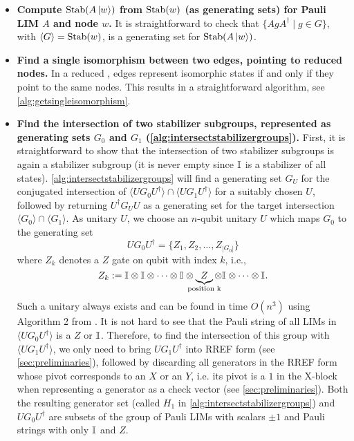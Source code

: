 \begin{itemize}
        \setlength\itemsep{1em}
    \item \textbf{Compute $\text{Stab}(A\ket{w})$ from $\text{Stab}(w)$ (as generating sets) for Pauli LIM $A$ and node $w$.} It is straightforward to check that $\{A g A^{\dagger} \mid g \in G\}$, with $\langle G \rangle = \text{Stab}(w)$, is a generating set for $\text{Stab}(A\ket{w})$.
    \item \textbf{Find a single isomorphism between two edges, pointing to reduced nodes.} In a reduced \limdd, edges represent isomorphic states if and only if they point to the same nodes. This results in a straightforward algorithm, see \autoref{alg:getsingleisomorphism}.
    \item \textbf{Find the intersection of two stabilizer subgroups, represented as generating sets $G_0$ and $G_1$ (\autoref{alg:intersectstabilizergroups}).} 
        First, it is straightforward to show that the intersection of two stabilizer subgroups is again a stabilizer subgroup (it is never empty since $\mathbb{I}_{}$ is a stabilizer of all states).
        \autoref{alg:intersectstabilizergroups} will find a generating set $G_U$ for the conjugated intersection of $\langle UG_0 U^{\dagger} \rangle \cap \langle U G_1 U^{\dagger} \rangle$ for a suitably chosen $U$, followed by returning $U^{\dagger} G_U U$ as a generating set for the target intersection $\langle G_0 \rangle \cap \langle G_1 \rangle$.
        As unitary $U$, we choose an $n$-qubit unitary $U$ which maps $G_0$ to the generating set
        \[
            UG_0 U^{\dagger} = \{Z_1, Z_2, \dots, Z_{|G_0|}\}
        \]
        where $Z_k$ denotes a $Z$ gate on qubit with index $k$, i.e., 
        \[
            Z_k := \id \otimes \id \otimes \dots \otimes \id \otimes \underbrace{Z}_{\mathclap{\textnormal{position k}}} \otimes \id \otimes \dots \otimes \id.
        \]
        Such a unitary always exists and can be found in time $O(n^3)$ using Algorithm 2 from \cite{garcia2012efficient}.
        It is not hard to see that the Pauli string of all LIMs in $\langle U G_0 U^{\dagger}\rangle$ is a $Z$ or $\mathbb{I}_{}$.
        Therefore, to find the intersection of this group with $\langle UG_1 U^{\dagger}\rangle$, we only need to bring $U G_1 U^{\dagger}$ into RREF form (see \autoref{sec:preliminaries}), followed by discarding all generators in the RREF form whose pivot corresponds to an $X$ or an $Y$, i.e. its pivot is a $1$ in the X-block when representing a generator as a check vector (see \autoref{sec:preliminaries}).
        Both the resulting generator set (called $H_1$ in \autoref{alg:intersectstabilizergroups}) and $U G_0 U^{\dagger}$ are subsets of the group of Pauli LIMs with scalars $\pm 1$ and Pauli strings with only $\mathbb{I}_{}$ and $Z$.

\end{itemize}
